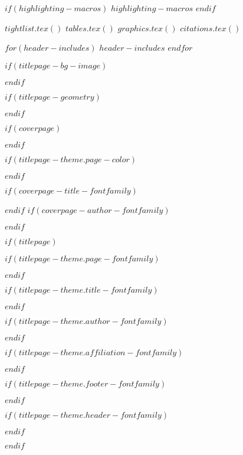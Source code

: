 $if(highlighting-macros)$
$highlighting-macros$
$endif$

$tightlist.tex()$
$tables.tex()$
$graphics.tex()$
$citations.tex()$

$for(header-includes)$
$header-includes$
$endfor$

\usepackage{hyphenat}
\usepackage{ifthen}
\usepackage{calc}
\usepackage{calculator}

$if(titlepage-bg-image)$
\usepackage{graphicx}
\usepackage{wallpaper}
$endif$

$if(titlepage-geometry)$
\usepackage{geometry}
$endif$

$if(coverpage)$
\usepackage{graphicx}
\usepackage{geometry}
\usepackage{afterpage}
\usepackage{tikz}
\usetikzlibrary{calc}
\usetikzlibrary{fadings}
\usepackage[pagecolor=none]{pagecolor}
$endif$

$if(titlepage-theme.page-color)$
\usepackage[pagecolor=none]{pagecolor}
$endif$

$if(coverpage-title-fontfamily)$
\usepackage{fontspec}
$endif$
$if(coverpage-author-fontfamily)$
\usepackage{fontspec}
$endif$

$if(titlepage)$

$if(titlepage-theme.page-fontfamily)$
\usepackage{fontspec}
$endif$

$if(titlepage-theme.title-fontfamily)$
\usepackage{fontspec}
$endif$

$if(titlepage-theme.author-fontfamily)$
\usepackage{fontspec}
$endif$

$if(titlepage-theme.affiliation-fontfamily)$
\usepackage{fontspec}
$endif$

$if(titlepage-theme.footer-fontfamily)$
\usepackage{fontspec}
$endif$

$if(titlepage-theme.header-fontfamily)$
\usepackage{fontspec}
$endif$

$endif$

